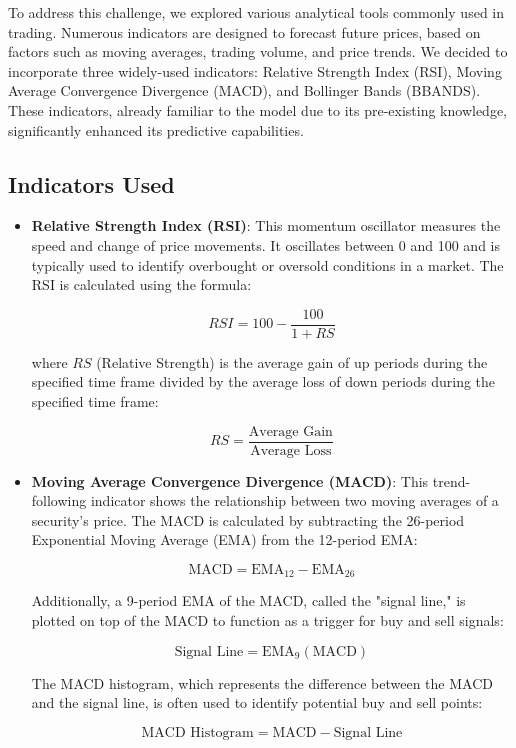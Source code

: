To address this challenge, we explored various analytical tools commonly used in trading. Numerous indicators are designed to forecast future prices, based on factors such as moving averages, trading volume, and price trends. We decided to incorporate three widely-used indicators: Relative Strength Index (RSI), Moving Average Convergence Divergence (MACD), and Bollinger Bands (BBANDS). These indicators, already familiar to the model due to its pre-existing knowledge, significantly enhanced its predictive capabilities.

\subsection{Indicators Used}

\begin{itemize}
    \item \textbf{Relative Strength Index (RSI)}: This momentum oscillator measures the speed and change of price movements. It oscillates between 0 and 100 and is typically used to identify overbought or oversold conditions in a market. The RSI is calculated using the formula:

    \[
    RSI = 100 - \frac{100}{1 + RS}
    \]

    where \( RS \) (Relative Strength) is the average gain of up periods during the specified time frame divided by the average loss of down periods during the specified time frame:

    \[
    RS = \frac{\text{Average Gain}}{\text{Average Loss}}
    \]

    \item \textbf{Moving Average Convergence Divergence (MACD)}: This trend-following indicator shows the relationship between two moving averages of a security's price. The MACD is calculated by subtracting the 26-period Exponential Moving Average (EMA) from the 12-period EMA:

    \[
    \text{MACD} = \text{EMA}_{12} - \text{EMA}_{26}
    \]

    Additionally, a 9-period EMA of the MACD, called the "signal line," is plotted on top of the MACD to function as a trigger for buy and sell signals:

    \[
    \text{Signal Line} = \text{EMA}_{9}(\text{MACD})
    \]

    The MACD histogram, which represents the difference between the MACD and the signal line, is often used to identify potential buy and sell points:

    \[
    \text{MACD Histogram} = \text{MACD} - \text{Signal Line}
    \]


\end{itemize}
